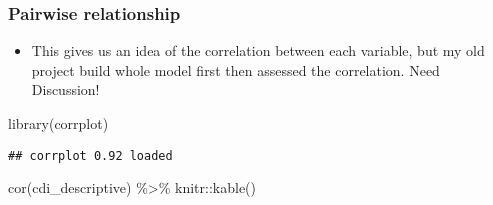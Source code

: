 \documentclass[
]{article}
\newenvironment{Shaded}{\begin{snugshade}}{\end{snugshade}}
\newcommand{\FunctionTok}[1]{\textcolor[rgb]{0.00,0.00,0.00}{#1}}
\newcommand{\NormalTok}[1]{#1}
\newcommand{\SpecialCharTok}[1]{\textcolor[rgb]{0.00,0.00,0.00}{#1}}
\providecommand{\tightlist}{%
  \setlength{\itemsep}{0pt}\setlength{\parskip}{0pt}}
\begin{document}
\hypertarget{pairwise-relationship}{%
\subsubsection{Pairwise relationship}\label{pairwise-relationship}}

\begin{itemize}
\tightlist
\item
  This gives us an idea of the correlation between each variable, but my
  old project build whole model first then assessed the correlation.
  Need Discussion!
\end{itemize}

\begin{Shaded}
\begin{Highlighting}[]
\FunctionTok{library}\NormalTok{(corrplot)}
\end{Highlighting}
\end{Shaded}

\begin{verbatim}
## corrplot 0.92 loaded
\end{verbatim}

\begin{Shaded}
\begin{Highlighting}[]
\FunctionTok{cor}\NormalTok{(cdi\_descriptive) }\SpecialCharTok{\%\textgreater{}\%}\NormalTok{ knitr}\SpecialCharTok{::}\FunctionTok{kable}\NormalTok{()}
\end{Highlighting}
\end{Shaded}
\end{document}
